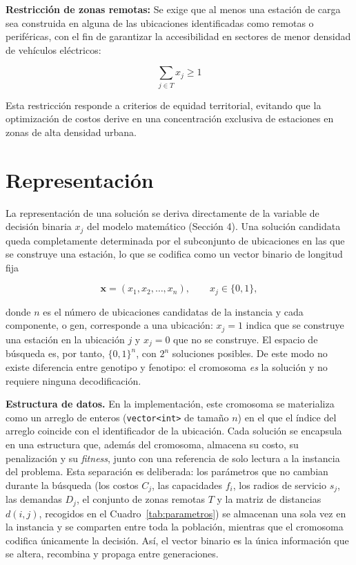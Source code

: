 \documentclass[letter, 10pt]{article}
\begin{document}
\textbf{Restricción de zonas remotas:} Se exige que al menos una estación de carga sea 
construida en alguna de las ubicaciones identificadas como remotas o periféricas, con el 
fin de garantizar la accesibilidad en sectores de menor densidad de vehículos eléctricos:

\[
\sum_{j \in T} x_j \geq 1 \tag{5}
\]

Esta restricción responde a criterios de equidad territorial, evitando que la optimización 
de costos derive en una concentración exclusiva de estaciones en zonas de alta densidad 
urbana.


\section{Representaci\'on}

La representación de una solución se deriva directamente de la variable de decisión
binaria $x_j$ del modelo matemático (Sección 4). Una solución candidata queda
completamente determinada por el subconjunto de ubicaciones en las que se construye una
estación, lo que se codifica como un vector binario de longitud fija

\[
\mathbf{x} = (x_1, x_2, \dots, x_n), \qquad x_j \in \{0,1\},
\]

donde $n$ es el número de ubicaciones candidatas de la instancia y cada componente, o gen,
corresponde a una ubicación: $x_j = 1$ indica que se construye una estación en la ubicación
$j$ y $x_j = 0$ que no se construye. El espacio de búsqueda es, por tanto, $\{0,1\}^n$, con
$2^n$ soluciones posibles. De este modo no existe diferencia entre genotipo y fenotipo: el
cromosoma \emph{es} la solución y no requiere ninguna decodificación.

\textbf{Estructura de datos.} En la implementación, este cromosoma se materializa como un
arreglo de enteros (\texttt{vector<int>} de tamaño $n$) en el que el índice del arreglo
coincide con el identificador de la ubicación. Cada solución se encapsula en una estructura
que, además del cromosoma, almacena su costo, su penalización y su \emph{fitness}, junto con
una referencia de solo lectura a la instancia del problema. Esta separación es deliberada: los
parámetros que no cambian durante la búsqueda (los costos $C_j$, las capacidades $f_i$, los
radios de servicio $s_j$, las demandas $D_j$, el conjunto de zonas remotas $T$ y la matriz de
distancias $d(i,j)$, recogidos en el Cuadro~\ref{tab:parametros}) se almacenan una sola vez en
la instancia y se comparten entre toda la población, mientras que el cromosoma codifica
únicamente la decisión. Así, el vector binario es la única información que se altera, recombina y propaga
entre generaciones.
\end{document}
